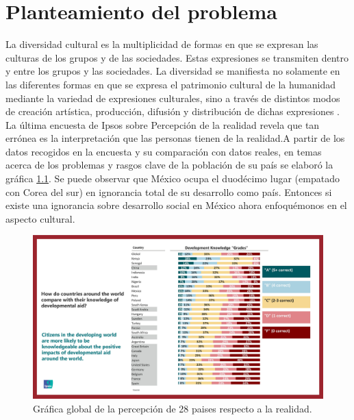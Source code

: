 \chapter{Planteamiento del problema} 

La diversidad cultural es la multiplicidad de formas en que se expresan las culturas de los grupos y de las sociedades. Estas expresiones se transmiten dentro y entre los grupos y las sociedades. La diversidad se manifiesta no solamente en las diferentes formas en que se expresa el patrimonio cultural de la humanidad mediante la variedad de expresiones culturales, sino a través de distintos modos de creación artística, producción, difusión y distribución de dichas expresiones \cite{pp05}.
\\[1pt]

La última encuesta de Ipsos sobre Percepción\cite{pp04} de la realidad revela que tan errónea es la interpretación que las personas tienen de la realidad.A partir de los datos recogidos en la encuesta y su comparación con datos reales, en temas acerca de los problemas y rasgos clave de la población de su país se elaboró la gráfica \ref{fig:ipso}. Se puede observar que México ocupa el duodécimo lugar (empatado con Corea del sur) en ignorancia total de su desarrollo como país. Entonces si existe una ignorancia sobre desarrollo social en México ahora enfoquémonos en el aspecto cultural.  
\\[1pt]

\begin{figure}
	\centering 
	\includegraphics[width=\textwidth]{03MarcoTeorico/imageR/ipso.jpg}
	\caption{Gráfica global de la percepción de 28 paises respecto a la realidad.}
	\label{fig:ipso}
\end{figure}


